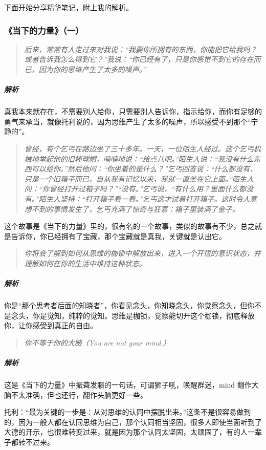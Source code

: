 下面开始分享精华笔记，附上我的解析。

\subsubsection{《当下的力量》（一）}

\begin{quote}\it
    后来，常常有人走过来对我说：“我要你所拥有的东西，你能把它给我吗？或者告诉我怎么得到它？”我说：“你已经有了，只是你感觉不到它的存在而已，因为你的思维产生了太多的噪声。”
\end{quote}

\subparagraph{解析} 真我本来就存在，不需要别人给你，只需要别人告诉你，指示给你，而你有足够的勇气来承当，就像托利说的，因为思维产生了太多的噪声，所以感受不到那个“宁静的”。

\begin{quote}\it
    曾经，有个乞丐在路边坐了三十多年。一天，一位陌生人经过。这个乞丐机械地举起他的旧棒球帽，喃喃地说：“给点儿吧。”陌生人说：“我没有什么东西可以给你。”然后他问：“你坐着的是什么？”乞丐回答说：“什么都没有，只是一个旧箱子而已，自从我有记忆以来，我就一直坐在它上面。”陌生人问：“你曾经打开过箱子吗？”“没有。”乞丐说，“有什么用？里面什么都没有。”陌生人坚持：“打开箱子看一看。”乞丐这才试着打开箱子。这时令人意想不到的事情发生了，乞丐充满了惊奇与狂喜：箱子里装满了金子。
\end{quote}

这个故事是《当下的力量》里的，很有名的一个故事，类似的故事有不少，总之就是告诉你，你已经拥有了宝藏，那个宝藏就是真我，关键就是认出它。

\begin{quote}\it
    你将会了解到如何从思维的枷锁中解放出来，进入一个开悟的意识状态，并理解如何在你的生活中维持这种状态。
\end{quote}

\subparagraph{解析} 你是“那个思考者后面的知晓者”，你看见念头，你知晓念头，你觉察念头，但你不是念头，你是觉知，纯粹的觉知。思维是枷锁，觉察能切开这个枷锁，彻底释放你，让你感受到真正的自由。

\begin{quote}\it
    你不等于你的大脑（You are not your mind.）
\end{quote}

\subparagraph{解析} 这是《当下的力量》中振聋发聩的一句话，可谓狮子吼，唤醒群迷，mind 翻作大脑不太准确，但也还行，翻作头脑更好一些。

托利：“最为关键的一步是：从对思维的认同中摆脱出来。”这条不是很容易做到的，因为一般人都在认同思维为自己，那个认同相当坚固，很多人即使当面听到了大德的开示，也很难转变过来，就是因为那个认同太坚固，太顽固了，有的人一辈子都转不过来。

